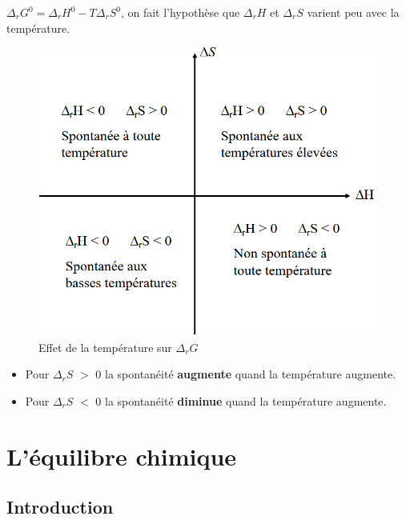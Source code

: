 \documentclass[10pt,a4paper]{book}
\begin{document}
\textbf{\(\Delta_rG^0 = \Delta_rH^0 - T\Delta_rS^0\)}, on fait l'hypothèse que $\Delta_rH$ et $\Delta_rS$ varient peu avec la température.
\begin{figure}[h!]
\begin{center}
\includegraphics[scale=0.75]{./assets/temp_gibbs.png}
\caption{Effet de la température sur $\Delta_rG$}
\label{fig:temp_gibbs}
\end{center}
\end{figure}
\begin{itemize}
\item Pour $\Delta_rS$ $>$ 0 la spontanéité \textbf{augmente} quand la température augmente.
\item Pour $\Delta_rS$ $<$ 0 la spontanéité \textbf{diminue} quand la température augmente.
\end{itemize}

\chapter{L’équilibre chimique}

\section{Introduction}
\end{document}
